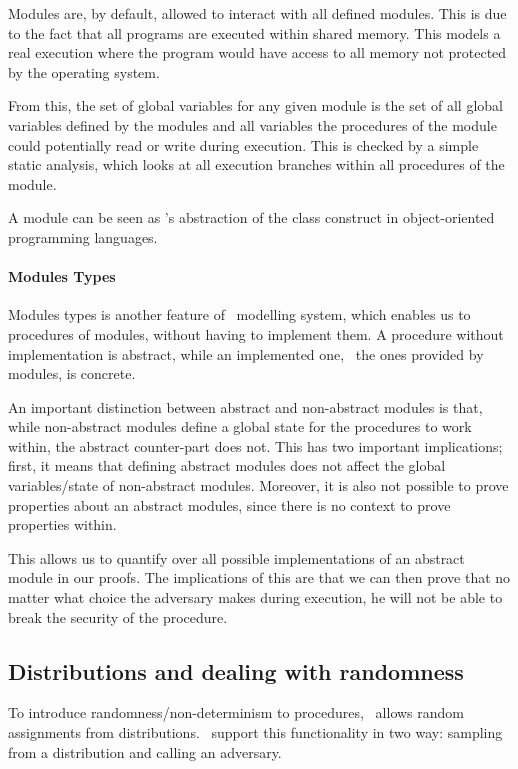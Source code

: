 Modules are, by default, allowed to interact with all defined modules.
This is due to the fact that all programs are executed within shared memory. This
models a real execution where the program would have access to
all memory not protected by the operating system.

From this, the set of global variables for any given module is the set of all
global variables defined by the modules and all variables the procedures of the module
could potentially read or write during execution. This is checked by a simple
static analysis, which looks at all execution branches within all procedures of the module.

A module can be seen as \easycrypt's abstraction of the class construct
in object-oriented programming languages.

\paragraph{Modules Types}
\label{sec:ec_module_types}
Modules types is another feature of \easycrypt\ modelling system, which
enables us to procedures of modules, without having to implement
them. A procedure without implementation is abstract, while
an implemented one, \ie\ the ones provided by modules, is concrete.

An important distinction between abstract and non-abstract modules is that,
while non-abstract modules define a global state for the procedures to work
within, the abstract counter-part does not. This has two important implications;
first, it means that defining abstract modules does not affect the global
variables/state of non-abstract modules.
Moreover, it is also not possible to prove properties about an abstract modules, since
there is no context to prove properties within.

This allows us to quantify over all possible implementations of an abstract
module in our proofs.
The implications of this are that we can then prove that no matter what choice
the adversary makes during execution, he will not be able to break the security
of the procedure.


\subsection{Distributions and dealing with randomness}
\label{sec:easycrypt:distributions}
To introduce randomness/non-determinism to procedures, \easycrypt\ allows
random assignments from distributions. \easycrypt\ support this functionality in
two way: sampling from a distribution and calling an adversary.


